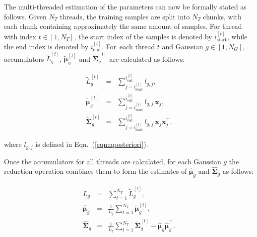 \documentclass[10pt,a4paper]{article}
\def\Vec#1{{\boldsymbol{#1}}}
\def\Mat#1{{\boldsymbol{#1}}}
\begin{document}
\vspace{-1ex}
The multi-threaded estimation of the parameters can now be formally stated as follows.
Given $N_T$ threads, the training samples are split into $N_T$ chunks, with each chunk containing approximately the same amount of samples.
For thread with index $t \in [1,N_T]$, the start index of the samples is denoted by $i^{[t]}_{\textrm{start}}$,
while the end index is denoted by $i^{[t]}_{\textrm{end}}$.
For~each thread $t$ and Gaussian $g \in [1,N_G]$, accumulators $\widetilde{L}_g^{[t]}$, $\widetilde{\Vec{\mu}}_g^{[t]}$ and $\widetilde{\Mat{\Sigma}}_g^{[t]}$
are calculated as follows:

\vspace{-5ex}
\begin{eqnarray}
  \widetilde{L}_g^{[t]}            & = & \sum\nolimits_{j = i^{[t]}_{\textrm{start}}}^{i^{[t]}_{\textrm{end}}} l_{g,j},                             \\ %
  \widetilde{\Vec{\mu}}_g^{[t]}    & = & \sum\nolimits_{j = i^{[t]}_{\textrm{start}}}^{i^{[t]}_{\textrm{end}}} l_{g,j} ~ \Vec{x}_j,                 \\ %
  \widetilde{\Mat{\Sigma}}_g^{[t]} & = & \sum\nolimits_{j = i^{[t]}_{\textrm{start}}}^{i^{[t]}_{\textrm{end}}} l_{g,j} ~ \Vec{x}_j \Vec{x}_j^\top.     %
\end{eqnarray}%

\vspace{-2ex}
where $l_{g,j}$ is defined in Eqn.~(\ref{eqn:aposteriori}).

Once the accumulators for all threads are calculated,
for each Gaussian $g$ the reduction operation combines them to form the estimates of $\widehat{\Vec{\mu}}_g$ and $\widehat{\Mat{\Sigma}}_g$ as follows:

\vspace{-3ex}
\begin{eqnarray}
  L_g                      & = & \sum\nolimits_{t=1}^{N_T} \widetilde{L}_g^{[t]},                           \label{eqn:combined_L_g} \\
  \widehat{\Vec{\mu}}_g    & = & \frac{1}{L_g} \sum\nolimits_{t=1}^{N_T} \widetilde{\Vec{\mu}}_g^{[t]},                              \\
  \widehat{\Mat{\Sigma}}_g & = & \frac{1}{L_g} \sum\nolimits_{t=1}^{N_T} \widetilde{\Mat{\Sigma}}_g^{[t]} - \widehat{\Vec{\mu}}_g \widehat{\Vec{\mu}}_g^\top.
\end{eqnarray}
\end{document}
